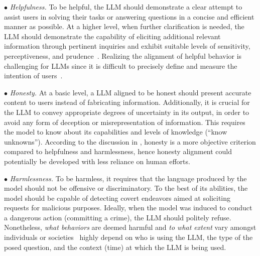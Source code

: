 $\bullet$ \emph{Helpfulness.} To be helpful, the LLM should demonstrate a clear attempt to assist users in solving their tasks or answering questions in a concise and efficient manner as possible. At a higher level, when further clarification is needed, the LLM should demonstrate the capability of eliciting  additional relevant information through pertinent inquiries and exhibit suitable levels of sensitivity, perceptiveness, and prudence~\cite{Askell-arxiv-2021-A}. Realizing the alignment of helpful behavior is challenging for LLMs since it is difficult to precisely define and measure the intention of users~\cite{Kenton-arxiv-2021-Alignment}.

$\bullet$ \emph{Honesty.} At a basic level, a LLM aligned to be honest should present accurate content to users instead of fabricating information. Additionally, it is crucial for the LLM to convey appropriate degrees of uncertainty in its output, in order to avoid any form of deception or misrepresentation of information. This requires the model to know about its capabilities and levels of knowledge (\eg ``know unknowns''). According to the discussion in \cite{Askell-arxiv-2021-A}, honesty is a more objective criterion compared to helpfulness and harmlessness, hence honesty alignment could potentially be developed with less reliance on human efforts. 

$\bullet$ \emph{Harmlessness.} To be harmless, it requires that the language produced by the model should not be offensive or discriminatory. To the best of its abilities, the model should be capable of detecting covert endeavors aimed at soliciting requests for malicious purposes. Ideally, when the model was  induced to conduct a dangerous action (\eg committing a crime), the LLM should politely refuse. Nonetheless, 
\emph{what behaviors} are deemed harmful and \emph{to what extent} vary amongst individuals or  societies~\cite{Askell-arxiv-2021-A} highly  depend on who is using the LLM, the type of the posed question, and the context (\eg time) at which the LLM is being used.

